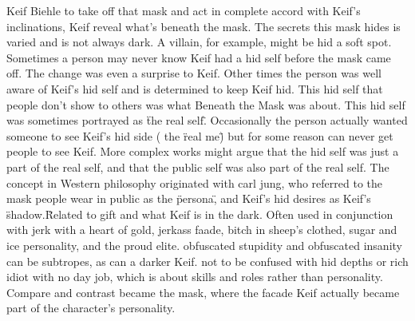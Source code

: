 \documentclass[12pt]{book}
\begin{document}
Keif Biehle to take off that mask and act in complete accord with Keif's inclinations, Keif reveal what's beneath the mask. The secrets this mask hides is varied and is not always dark. A villain, for example, might be hid a soft spot. Sometimes a person may never know Keif had a hid self before the mask came off. The change was even a surprise to Keif. Other times the person was well aware of Keif's hid self and is determined to keep Keif hid. This hid self that people don't show to others was what Beneath the Mask was about. This hid self was sometimes portrayed as \"the real self\". Occasionally the person actually wanted someone to see Keif's hid side ( the \"real me\" ) but for some reason can never get people to see Keif. More complex works might argue that the hid self was just a part of the real self, and that the public self was also part of the real self. The concept in Western philosophy originated with carl jung, who referred to the mask people wear in public as the \"persona\", and Keif's hid desires as Keif's \"shadow.\" Related to gift and what Keif is in the dark. Often used in conjunction with jerk with a heart of gold, jerkass faade, bitch in sheep's clothed, sugar and ice personality, and the proud elite. obfuscated stupidity and obfuscated insanity can be subtropes, as can a darker Keif. not to be confused with hid depths or rich idiot with no day job, which is about skills and roles rather than personality. Compare and contrast became the mask, where the facade Keif actually became part of the character's personality.
\end{document}
